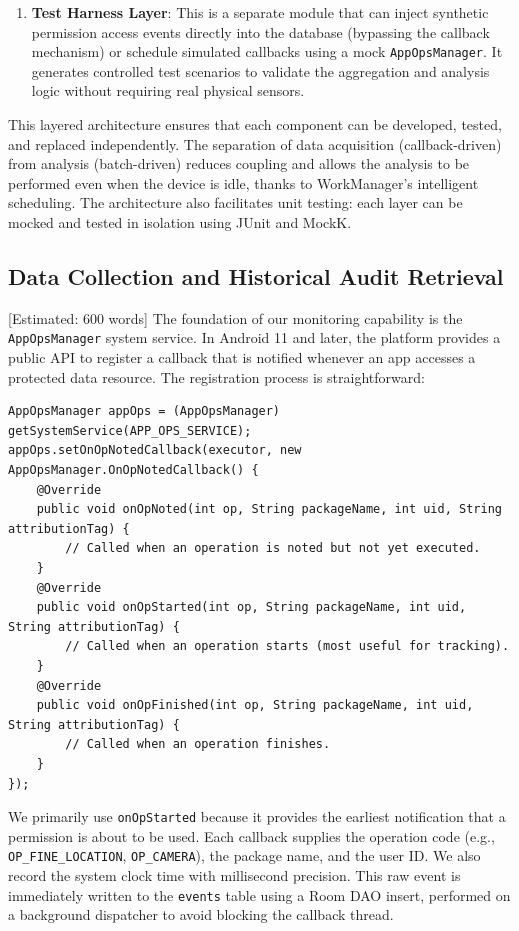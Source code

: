 \begin{enumerate}
\item \textbf{Test Harness Layer}: This is a separate module that can inject synthetic permission access events directly into the database (bypassing the callback mechanism) or schedule simulated callbacks using a mock \texttt{AppOpsManager}. It generates controlled test scenarios to validate the aggregation and analysis logic without requiring real physical sensors.
\end{enumerate}

This layered architecture ensures that each component can be developed, tested, and replaced independently. The separation of data acquisition (callback-driven) from analysis (batch-driven) reduces coupling and allows the analysis to be performed even when the device is idle, thanks to WorkManager's intelligent scheduling. The architecture also facilitates unit testing: each layer can be mocked and tested in isolation using JUnit and MockK.

\subsection{Data Collection and Historical Audit Retrieval} [Estimated: 600 words]
The foundation of our monitoring capability is the \texttt{AppOpsManager} system service. In Android 11 and later, the platform provides a public API to register a callback that is notified whenever an app accesses a protected data resource. The registration process is straightforward:

\begin{lstlisting}[caption=Registering the permission callback]
AppOpsManager appOps = (AppOpsManager) getSystemService(APP_OPS_SERVICE);
appOps.setOnOpNotedCallback(executor, new AppOpsManager.OnOpNotedCallback() {
    @Override
    public void onOpNoted(int op, String packageName, int uid, String attributionTag) {
        // Called when an operation is noted but not yet executed.
    }
    @Override
    public void onOpStarted(int op, String packageName, int uid, String attributionTag) {
        // Called when an operation starts (most useful for tracking).
    }
    @Override
    public void onOpFinished(int op, String packageName, int uid, String attributionTag) {
        // Called when an operation finishes.
    }
});
\end{lstlisting}

We primarily use \texttt{onOpStarted} because it provides the earliest notification that a permission is about to be used. Each callback supplies the operation code (e.g., \texttt{OP\_FINE\_LOCATION}, \texttt{OP\_CAMERA}), the package name, and the user ID. We also record the system clock time with millisecond precision. This raw event is immediately written to the \texttt{events} table using a Room DAO insert, performed on a background dispatcher to avoid blocking the callback thread.

